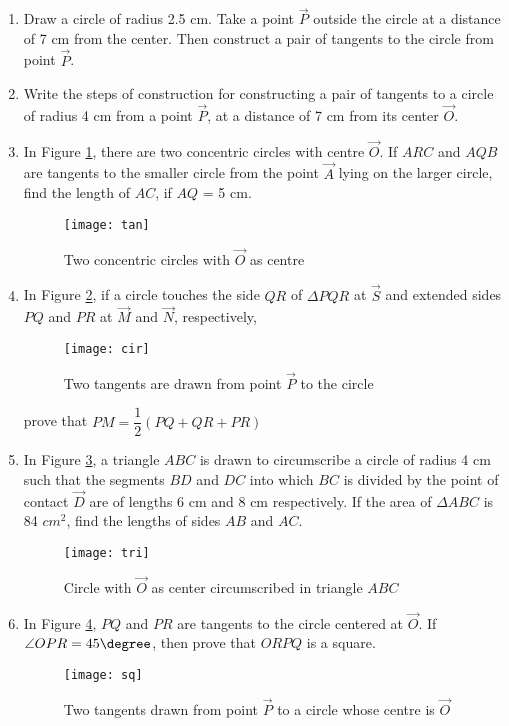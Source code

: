 \begin{enumerate}

	\item Draw a circle of radius 2.5 cm. Take a point $\vec{P}$ outside the circle at a distance of 7 cm from the center. Then construct a pair of tangents to the circle from point $\vec{P}$.

	\item Write the steps of construction for constructing a pair of tangents to a circle of radius 4 cm from a point $\vec{P}$, at a distance of 7 cm from its center $\vec{O}$.

	\item In Figure \ref{fig:tan1}, there are two concentric circles with centre $\vec{O}$. If $ARC$ and $AQB$ are tangents to the smaller circle  from the point $\vec{A}$ lying on the larger circle, find the length of $AC$, if $AQ$ = 5 cm.
		\begin{figure}[H]
			\centering
			\texttt{[image: tan]}
			\caption{Two concentric circles with $\vec{O}$ as centre}
			\label{fig:tan1}
		\end{figure}
	
	\item In Figure \ref{fig:cir1}, if a circle touches the side $QR$ of $\Delta PQR$ at $\vec{S}$ and extended sides $PQ$ and $PR$ at $\vec{M}$ and $\vec{N}$, respectively,
		\begin{figure}[H]
			\centering
			\texttt{[image: cir]}
				\caption{Two tangents are drawn from point $\vec{P}$ to the circle}
				\label{fig:cir1}
		\end{figure}
		prove that $PM=\dfrac{1}{2}(PQ+QR+PR)$

	\item In Figure \ref{fig:tri1}, a triangle $ABC$ is drawn to circumscribe a circle of radius 4 cm such that the segments $BD$ and $DC$ into which $BC$ is divided by the point of contact $\vec{D}$ are of lengths 6 cm and 8 cm respectively. If the area of $\Delta ABC$ is 84 $cm^2$, find the lengths of sides $AB$ and $AC$.
		\begin{figure}[H]
			\centering
			\texttt{[image: tri]}
				\caption{Circle with $\vec{O}$ as center circumscribed in triangle $ABC$}
				\label{fig:tri1}
		\end{figure}

	\item In Figure \ref{fig:sq1}, $PQ$ and $PR$ are tangents to the circle centered at $\vec{O}$. If $\angle OPR=45\degree$, then prove that $ORPQ$ is a square.
		\begin{figure}[H]
			\centering
			\texttt{[image: sq]}
			\caption{Two tangents drawn from point $\vec{P}$ to a circle whose centre is $\vec{O}$}
			\label{fig:sq1}
		\end{figure}


\end{enumerate}
